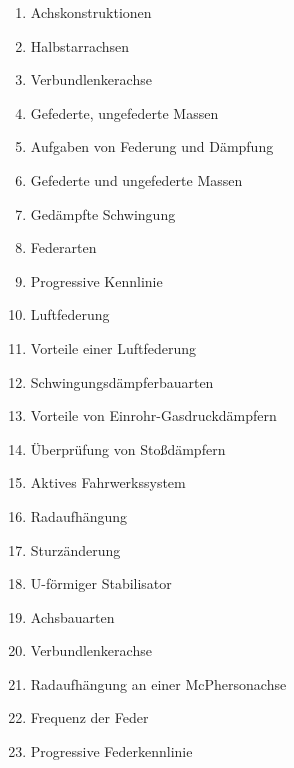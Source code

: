 \begin{enumerate}
\item
  Achskonstruktionen\\
\item
  Halbstarrachsen\\
\item
  Verbundlenkerachse\\
\item
  Gefederte, ungefederte Massen\\
\item
  Aufgaben von Federung und Dämpfung\\
\item
  Gefederte und ungefederte Massen\\
\item
  Gedämpfte Schwingung\\
\item
  Federarten\\
\item
  Progressive Kennlinie\\
\item
  Luftfederung\\
\item
  Vorteile einer Luftfederung\\
\item
  Schwingungsdämpferbauarten\\
\item
  Vorteile von Einrohr-Gasdruckdämpfern\\
\item
  Überprüfung von Stoßdämpfern\\
\item
  Aktives Fahrwerkssystem\\
\item
  Radaufhängung\\
\item
  Sturzänderung\\
\item
  U-förmiger Stabilisator\\
\item
  Achsbauarten\\
\item
  Verbundlenkerachse\\
\item
  Radaufhängung an einer McPhersonachse\\
\item
  Frequenz der Feder\\
\item
  Progressive Federkennlinie\\

\end{enumerate}
